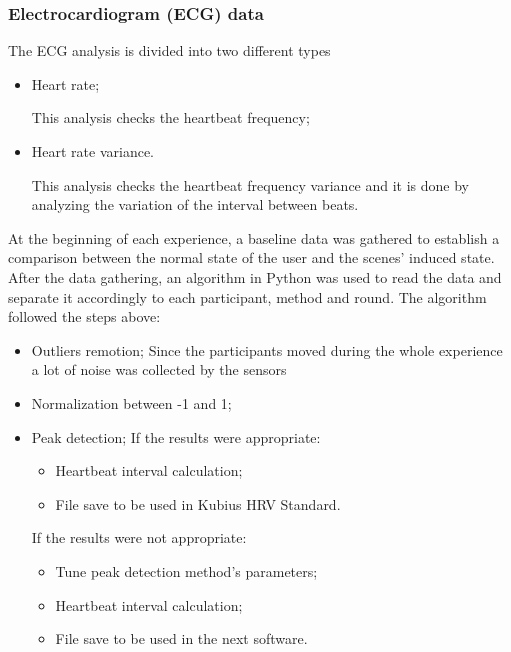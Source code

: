 \subsubsection{Electrocardiogram (ECG) data}
\label{subsubsec:results_ecg_1}

The ECG analysis is divided into two different types

\begin{itemize}
    \item Heart rate;
    
        This analysis checks the heartbeat frequency;

    \item Heart rate variance.
    
        This analysis checks the heartbeat frequency variance and it is done by analyzing the variation of the interval between beats.

\end{itemize}

At the beginning of each experience, a baseline data was gathered to establish a comparison between the normal state of the user and the scenes’ induced state. After the data gathering, an algorithm in Python was used to read the data and separate it accordingly to each participant, method and round. The algorithm followed the steps above:

\begin{itemize}
    \item Outliers remotion;
        Since the participants moved during the whole experience a lot of noise was collected by the sensors
    \item Normalization between -1 and 1;
    \item Peak detection;
        If the results were appropriate:
        \begin{itemize}
            \item Heartbeat interval calculation;
            \item File save to be used in Kubius HRV Standard.
        \end{itemize} 
        If the results were not appropriate:
        \begin{itemize}
            \item Tune peak detection method’s parameters;
            \item Heartbeat interval calculation;
            \item File save to be used in the next software.
        \end{itemize}    
\end{itemize}

